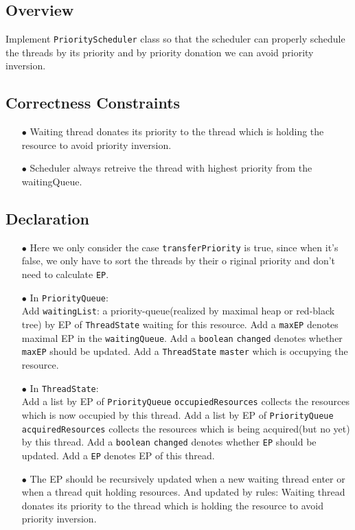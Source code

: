 \documentclass{article}
\begin{document}
\subsection{Overview}
Implement \texttt{PriorityScheduler} class so that the scheduler can properly schedule the threads by its priority and by priority donation 
we can avoid priority inversion.
\subsection{Correctness Constraints}
\begin{enumerate}
	\item[$\bullet$] Waiting thread donates its priority to the thread which is holding the resource to avoid priority inversion.
	\item[$\bullet$] Scheduler always retreive the thread with highest priority from the waitingQueue.
\end{enumerate}
\subsection{Declaration}
\begin{enumerate}
	\item[$\bullet$] Here we only consider the case \texttt{transferPriority} is true, since when it's false, we only have to sort the threads by 
		their o riginal priority and don't need to calculate \texttt{EP}.
	\item[$\bullet$] In \texttt{PriorityQueue}: \\
		Add \texttt{waitingList}: a priority-queue(realized by maximal heap or red-black tree) by EP of \texttt{ThreadState} waiting for this resource.
		Add a \texttt{maxEP} denotes maximal EP in the \texttt{waitingQueue}.
		Add a \texttt{boolean} \texttt{changed} denotes whether \texttt{maxEP} should be updated.
		Add a \texttt{ThreadState} \texttt{master} which is occupying the resource.
	\item[$\bullet$] In \texttt{ThreadState}: \\
		Add a list by EP of \texttt{PriorityQueue} \texttt{occupiedResources} collects the resources which is now occupied by this thread. 
		Add a list by EP of \texttt{PriorityQueue} \texttt{acquiredResources} collects the resources which is being acquired(but no yet) by this thread.
		Add a \texttt{boolean} \texttt{changed} denotes whether \texttt{EP} should be updated.
		Add a \texttt{EP} denotes EP of this thread.
	\item[$\bullet$] The EP should be recursively updated when a new waiting thread enter or when a thread quit holding resources. 
		And updated by rules: Waiting thread donates its priority to the thread which is holding the resource to avoid priority inversion.
\end{enumerate}
\end{document}
